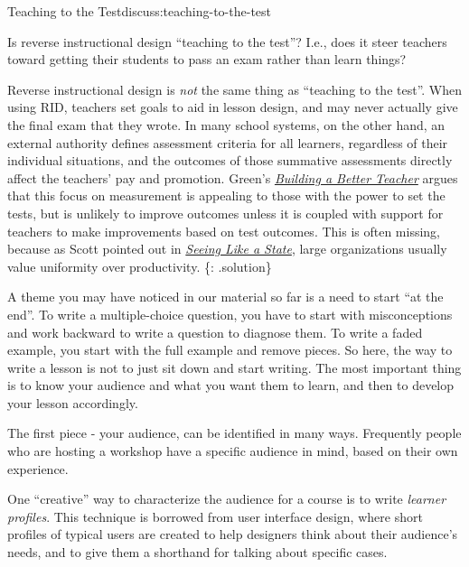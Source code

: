 \begin{discussion}{Teaching to the Test}{discuss:teaching-to-the-test}

Is reverse instructional design ``teaching to the test''? I.e., does it
steer teachers toward getting their students to pass an exam rather than
learn things?

Reverse instructional design is \emph{not} the same thing as ``teaching
to the test''. When using RID, teachers set goals to aid in lesson
design, and may never actually give the final exam that they wrote. In
many school systems, on the other hand, an external authority defines
assessment criteria for all learners, regardless of their individual
situations, and the outcomes of those summative assessments directly
affect the teachers' pay and promotion. Green's
\emph{\href{http://www.amazon.com/Building-Better-Teacher-Teaching-Everyone/dp/0393351084/}{Building
a Better Teacher}} argues that this focus on measurement is appealing to
those with the power to set the tests, but is unlikely to improve
outcomes unless it is coupled with support for teachers to make
improvements based on test outcomes. This is often missing, because as
Scott pointed out in
\emph{\href{http://www.amazon.com/Seeing-like-State-Certain-Condition/dp/0300078153/}{Seeing
Like a State}}, large organizations usually value uniformity over
productivity. \{: .solution\}
\end{discussion}


A theme you may have noticed in our material so far is a need to start
``at the end''. To write a multiple-choice question, you have to start
with
misconceptions and work backward to write a question to diagnose
them. To write a faded example, you start with the full example and
remove pieces. So here, the way to write a lesson is not to just sit
down and start writing. The most important thing is to know your
audience and what you want them to learn, and then to develop your
lesson accordingly.


The first piece - your audience, can be identified in many ways.
Frequently people who are hosting a workshop have a specific audience in
mind, based on their own experience.

One ``creative'' way to characterize the audience for a course is to
write \emph{learner profiles}. This technique is borrowed from user
interface design, where short profiles of typical users are created to
help designers think about their audience's needs, and to give them a
shorthand for talking about specific cases.

